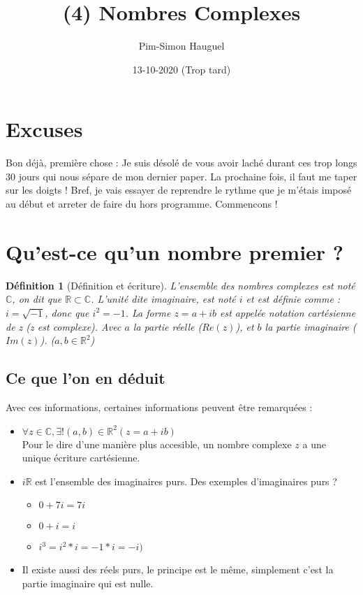 \documentclass{article}
\title{(4) Nombres Complexes}
\author{Pim-Simon Hauguel}
\date{13-10-2020 (Trop tard)}
\newtheorem{defi}{Définition}
\begin{document}
\maketitle

\tableofcontents

\section{Excuses}
Bon déjà, première chose : Je suis désolé de vous avoir laché durant ces trop longs 30 jours qui nous sépare de mon dernier paper. La prochaine fois, il faut me taper sur les doigts ! Bref, je vais essayer de reprendre le rythme que je m'étais imposé au début et arreter de faire du hors programme. Commencons !

\section{Qu'est-ce qu'un nombre premier ?}
\begin{defi}[Définition et écriture]
  L'ensemble des nombres complexes est noté $\mathbb{C}$, on dit que
  $\mathbb{R} \subset \mathbb{C}$.
  L'unité dite imaginaire, est noté $i$ et est définie comme : $i = \sqrt{-1}$, donc que $i^{2} = -1$.
  La forme $z = a + ib$ est appelée \textit{notation cartésienne} de z (z est complexe).
  Avec $a$ la partie réelle ($Re(z)$), et $b$ la partie imaginaire ($Im(z)$). ($a,b \in \mathbb{R}^{2}$)
\end{defi}
\subsection{Ce que l'on en déduit}
Avec ces informations, certaines informations peuvent être remarquées :\\
\begin{itemize}
  \item $\forall z \in \mathbb{C},\exists! (a,b) \in \mathbb{R}^{2}(z = a + ib)$\\
    Pour le dire d'une manière plus accesible, un nombre complexe $z$ a une unique écriture cartésienne.
  \item $i\mathbb{R}$ est l'ensemble des imaginaires purs. Des exemples d'imaginaires purs ?
    \begin{itemize}
      \item $0 + 7i = 7i$
      \item $0 + i = i$
      \item $i^{3} = i^{2} * i = -1 * i = -i)$
    \end{itemize}
  \item Il existe aussi des réels purs, le principe est le même, simplement c'est la partie imaginaire qui est nulle.
\end{itemize}
\end{document}
